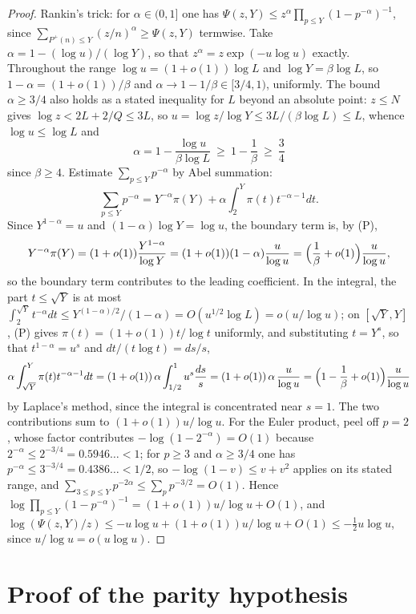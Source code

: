 \documentclass[11pt,a4paper]{article}
\theoremstyle{plain}
\theoremstyle{definition}
\theoremstyle{remark}
\newcommand{\Pp}{P^{+}}
\begin{document}
\begin{proof}
Rankin's trick: for $\alpha\in(0,1]$ one has
$\Psi(z,Y)\le z^{\alpha}\prod_{p\le Y}(1-p^{-\alpha})^{-1}$, since
$\sum_{\Pp(n)\le Y}(z/n)^{\alpha}\ge\Psi(z,Y)$ termwise. Take $\alpha=1-(\log u)/(\log Y)$, so that
$z^{\alpha}=z\exp(-u\log u)$ exactly. Throughout the range $\log u=(1+o(1))\log L$ and
$\log Y=\beta\log L$, so $1-\alpha=(1+o(1))/\beta$ and $\alpha\to1-1/\beta\in[3/4,1)$, uniformly. The
bound $\alpha\ge3/4$ also holds as a stated inequality for $L$ beyond an absolute point:
$z\le N$ gives $\log z<2L+2/Q\le3L$, so $u=\log z/\log Y\le3L/(\beta\log L)\le L$, whence
$\log u\le\log L$ and
\[
  \alpha=1-\frac{\log u}{\beta\log L}\ \ge\ 1-\frac1\beta\ \ge\ \frac34
\]
since $\beta\ge4$. Estimate
$\sum_{p\le Y}p^{-\alpha}$ by Abel summation:
\[
  \sum_{p\le Y}p^{-\alpha}=Y^{-\alpha}\pi(Y)+\alpha\int_{2}^{Y}\pi(t)t^{-\alpha-1}dt .
\]
Since $Y^{1-\alpha}=u$ and $(1-\alpha)\log Y=\log u$, the boundary term is, by (P),
\[
  Y^{-\alpha}\pi(Y)=(1+o(1))\frac{Y^{1-\alpha}}{\log Y}=(1+o(1))(1-\alpha)\frac u{\log u}
  =\Bigl(\frac1\beta+o(1)\Bigr)\frac u{\log u},
\]
so the boundary term contributes to the leading coefficient. In the integral, the part $t\le\sqrt Y$ is at
most $\int_{2}^{\sqrt Y}t^{-\alpha}dt\le Y^{(1-\alpha)/2}/(1-\alpha)=O(u^{1/2}\log L)=o(u/\log u)$; on
$[\sqrt Y,Y]$, (P) gives $\pi(t)=(1+o(1))t/\log t$ uniformly, and substituting $t=Y^{s}$, so that
$t^{1-\alpha}=u^{s}$ and $dt/(t\log t)=ds/s$,
\[
  \alpha\int_{\sqrt Y}^{Y}\pi(t)t^{-\alpha-1}dt
  =(1+o(1))\,\alpha\int_{1/2}^{1}u^{s}\frac{ds}s=(1+o(1))\,\alpha\,\frac u{\log u}
  =\Bigl(1-\frac1\beta+o(1)\Bigr)\frac u{\log u}
\]
by Laplace's method, since the integral is concentrated near $s=1$. The two contributions sum to $(1+o(1))u/\log u$. For the Euler product, peel off $p=2$, whose
factor contributes $-\log(1-2^{-\alpha})=O(1)$ because $2^{-\alpha}\le2^{-3/4}=0.5946\ldots<1$; for
$p\ge3$ and $\alpha\ge3/4$ one has $p^{-\alpha}\le3^{-3/4}=0.4386\ldots<1/2$, so $-\log(1-v)\le v+v^{2}$
applies on its stated range, and $\sum_{3\le p\le Y}p^{-2\alpha}\le\sum_{p}p^{-3/2}=O(1)$. Hence
$\log\prod_{p\le Y}(1-p^{-\alpha})^{-1}=(1+o(1))u/\log u+O(1)$, and
$\log(\Psi(z,Y)/z)\le-u\log u+(1+o(1))u/\log u+O(1)\le-\frac12u\log u$, since $u/\log u=o(u\log u)$.
\end{proof}

\section{Proof of the parity hypothesis}\label{sec:PC}
\end{document}
